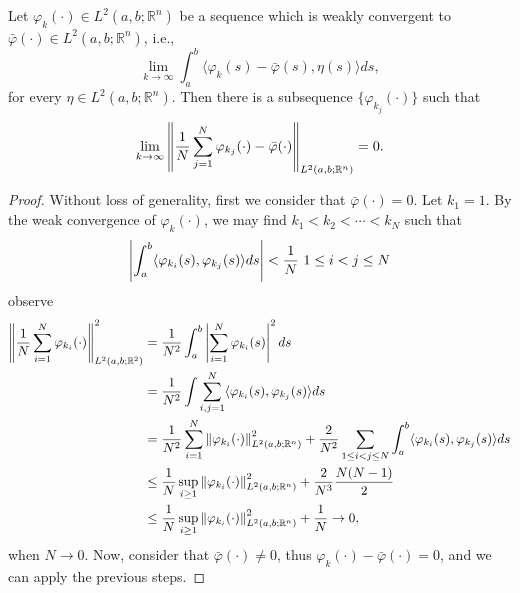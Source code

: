     \begin{theorem}\label{BST}
        Let $\varphi_k(\cdot) \in L^2(a,b ; \mathbb{R}^n)$ be a sequence which is weakly
        convergent to $\bar{\varphi}(\cdot) \in L^2(a,b; \mathbb{R}^n)$, i.e.,
        $$
            \lim_{k\to \infty} \int_{a}^{b} \langle\varphi_{k}(s)-\bar{\varphi}(s),\eta(s)\rangle ds, 
        $$
        for every $\eta\in L^2(a,b;\mathbb{R}^n)$. Then there is a subsequence
        $\{\varphi_{k_j}(\cdot)\}$ such that
        $$
            \lim_{k\to \infty}\norm{\frac{1}{N}\sum_{j=1}^{N}\varphi_{k_j}(\cdot) - %
            \bar{\varphi}(\cdot)}_{L^2(a,b;\mathbb{R}^n)} = 0.
        $$
    \end{theorem}
    \begin{proof}    
        Without loss of generality, first we consider that $\bar{\varphi}(\cdot)=0$. 
        Let $k_1=1$. By the weak convergence of $\varphi_k(\cdot)$, we may find
        $k_1<k_2<\cdots <k_N$ such that
        $$   
            \abs{\int_{a}^{b}\langle\varphi_{k_i}(s), \varphi_{k_j}(s)\rangle ds} < %
            \frac{1}{N}\,\, 1\leq i<j\leq N
        $$
        observe
        \begin{align*}
            \norm{\frac{1}{N}\sum_{i=1}^{N}\varphi_{k_i}(\cdot)}^2_{L^2(a,b;\mathbb{R}^2)}%
            &= \frac{1}{N^2}\int_{a}^{b}\abs{\sum_{i=1}^{N}\varphi_{k_i}(s)}^2 ds \\
            &= \frac{1}{N^2} \int \sum_{i,j=1}^{N} \langle\varphi_{k_i}(s), %
                \varphi_{k_j}(s)\rangle ds \\
            &= \frac{1}{N^2}\sum_{i=1}^{N}\norm{\varphi_{k_i}(\cdot)}^2_{L^2(a,b;\mathbb{R}^n)}%
                +\frac{2}{N^2}\sum_{1\leq i<j \leq N}\int_{a}^{b} \langle\varphi_{k_i}(s), %
                \varphi_{k_j}(s)\rangle ds \\
            &\leq \frac{1}{N}\sup_{i\geq 1} \norm{\varphi_{k_i}(\cdot)}^2_{L^2(a,b;\mathbb{R}^n)} %
                +\frac{2}{N^3}\frac{N(N-1)}{2} \\
            &\leq \frac{1}{N}\sup_{i\geq 1}\norm{\varphi_{k_i}(\cdot)}^2_{L^2(a,b;\mathbb{R}^n)} %
                +\frac{1}{N}\to 0,
    	\end{align*}
    	when $N\to 0$. Now, consider that $\bar{\varphi}(\cdot)\neq 0$, thus
    	$\varphi_{k}(\cdot)-\bar{\varphi}(\cdot)=0$, and we can apply the previous steps.
    \end{proof}
